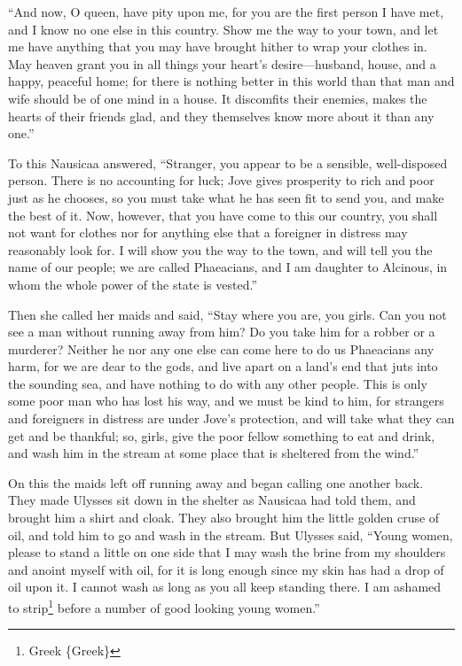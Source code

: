 “And now, O queen, have pity upon me, for you are the first person I have met,
and I know no one else in this country. Show me the way to your town, and let
me have anything that you may have brought hither to wrap your clothes in. May
heaven grant you in all things your heart’s desire—husband, house, and a happy,
peaceful home; for there is nothing better in this world than that man and wife
should be of one mind in a house. It discomfits their enemies, makes the hearts
of their friends glad, and they themselves know more about it than any one.”

To this Nausicaa answered, “Stranger, you appear to be a sensible,
well-disposed person. There is no accounting for luck; Jove gives prosperity to
rich and poor just as he chooses, so you must take what he has seen fit to send
you, and make the best of it. Now, however, that you have come to this our
country, you shall not want for clothes nor for anything else that a foreigner
in distress may reasonably look for. I will show you the way to the town, and
will tell you the name of our people; we are called Phaeacians, and I am
daughter to Alcinous, in whom the whole power of the state is vested.”

Then she called her maids and said, “Stay where you are, you girls. Can you not
see a man without running away from him? Do you take him for a robber or a
murderer? Neither he nor any one else can come here to do us Phaeacians any
harm, for we are dear to the gods, and live apart on a land’s end that juts
into the sounding sea, and have nothing to do with any other people. This is
only some poor man who has lost his way, and we must be kind to him, for
strangers and foreigners in distress are under Jove’s protection, and will take
what they can get and be thankful; so, girls, give the poor fellow something to
eat and drink, and wash him in the stream at some place that is sheltered from
the wind.”

On this the maids left off running away and began calling one another back.
They made Ulysses sit down in the shelter as Nausicaa had told them, and
brought him a shirt and cloak. They also brought him the little golden cruse of
oil, and told him to go and wash in the stream. But Ulysses said, “Young women,
please to stand a little on one side that I may wash the brine from my
shoulders and anoint myself with oil, for it is long enough since my skin has
had a drop of oil upon it. I cannot wash as long as you all keep standing
there. I am ashamed to strip\footnote{Greek \{Greek\}} before a number of good looking young
women.”

